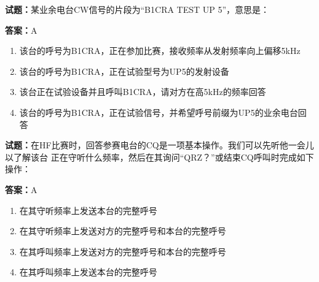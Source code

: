 \documentclass{ctexbook}
\begin{document}




\vspace{1em}

\textbf{试题：}某业余电台CW信号的片段为“B1CRA TEST UP 5”，意思是： 

\textbf{答案：}A 

\begin{enumerate}[leftmargin=3em]
  \item 该台的呼号为B1CRA，正在参加比赛，接收频率从发射频率向上偏移5kHz 

  \item 该台的呼号为B1CRA，正在试验型号为UP5的发射设备 

  \item 该台正在试验设备并且呼叫B1CRA，请对方在高5kHz的频率回答 

  \item 该台的呼号为B1CRA，正在试验信号，并希望呼号前缀为UP5的业余电台回答 

\end{enumerate}





\vspace{1em}

\textbf{试题：}在HF比赛时，回答参赛电台的CQ是一项基本操作。我们可以先听他一会儿以了解该台
正在守听什么频率，然后在其询问“QRZ？”或结束CQ呼叫时完成如下操作： 

\textbf{答案：}A 

\begin{enumerate}[leftmargin=3em]
  \item 在其守听频率上发送本台的完整呼号 

  \item 在其守听频率上发送对方的完整呼号和本台的完整呼号 

  \item 在其呼叫频率上发送对方的完整呼号和本台的完整呼号 

  \item 在其呼叫频率上发送本台的完整呼号 

\end{enumerate}





\vspace{1em}
\end{document}
